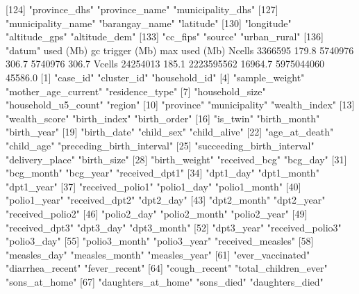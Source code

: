 [124] "province_dhs"              "province_name"             "municipality_dhs"         
[127] "municipality_name"         "barangay_name"             "latitude"                 
[130] "longitude"                 "altitude_gps"              "altitude_dem"             
[133] "cc_fips"                   "source"                    "urban_rural"              
[136] "datum"                    
           used  (Mb) gc trigger    (Mb)   max used    (Mb)
Ncells  3366595 179.8    5740976   306.7    5740976   306.7
Vcells 24254013 185.1 2223595562 16964.7 5975044060 45586.0
  [1] "case_id"                   "cluster_id"                "household_id"             
  [4] "sample_weight"             "mother_age_current"        "residence_type"           
  [7] "household_size"            "household_u5_count"        "region"                   
 [10] "province"                  "municipality"              "wealth_index"             
 [13] "wealth_score"              "birth_index"               "birth_order"              
 [16] "is_twin"                   "birth_month"               "birth_year"               
 [19] "birth_date"                "child_sex"                 "child_alive"              
 [22] "age_at_death"              "child_age"                 "preceding_birth_interval" 
 [25] "succeeding_birth_interval" "delivery_place"            "birth_size"               
 [28] "birth_weight"              "received_bcg"              "bcg_day"                  
 [31] "bcg_month"                 "bcg_year"                  "received_dpt1"            
 [34] "dpt1_day"                  "dpt1_month"                "dpt1_year"                
 [37] "received_polio1"           "polio1_day"                "polio1_month"             
 [40] "polio1_year"               "received_dpt2"             "dpt2_day"                 
 [43] "dpt2_month"                "dpt2_year"                 "received_polio2"          
 [46] "polio2_day"                "polio2_month"              "polio2_year"              
 [49] "received_dpt3"             "dpt3_day"                  "dpt3_month"               
 [52] "dpt3_year"                 "received_polio3"           "polio3_day"               
 [55] "polio3_month"              "polio3_year"               "received_measles"         
 [58] "measles_day"               "measles_month"             "measles_year"             
 [61] "ever_vaccinated"           "diarrhea_recent"           "fever_recent"             
 [64] "cough_recent"              "total_children_ever"       "sons_at_home"             
 [67] "daughters_at_home"         "sons_died"                 "daughters_died"           
